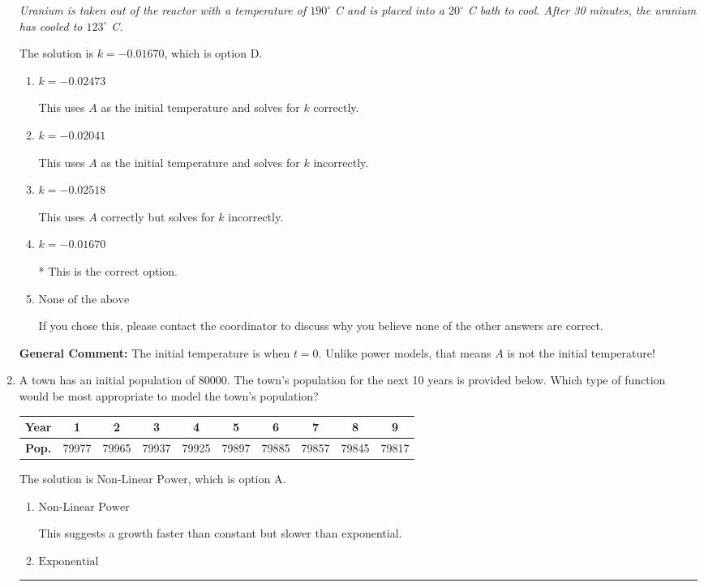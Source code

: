 \documentclass{extbook}[14pt]
\newcommand{\litem}[1]{\item #1

\rule{\textwidth}{0.4pt}}
\begin{document}
\begin{enumerate}
{\begin{center}
    \textit{ Uranium is taken out of the reactor with a temperature of $190^{\circ}$ C and is placed into a $20^{\circ}$ C bath to cool. After 30 minutes, the uranium has cooled to $123^{\circ}$ C. }
\end{center}


The solution is \( k = -0.01670 \), which is option D.\begin{enumerate}[label=\Alph*.]
\item \( k = -0.02473 \)

This uses $A$ as the initial temperature and solves for $k$ correctly.
\item \( k = -0.02041 \)

This uses $A$ as the initial temperature and solves for $k$ incorrectly.
\item \( k = -0.02518 \)

This uses $A$ correctly but solves for $k$ incorrectly.
\item \( k = -0.01670 \)

* This is the correct option.
\item \( \text{None of the above} \)

If you chose this, please contact the coordinator to discuss why you believe none of the other answers are correct.
\end{enumerate}

\textbf{General Comment:} The initial temperature is when $t = 0$. Unlike power models, that means $A$ is not the initial temperature!
}
\litem{
A town has an initial population of 80000. The town's population for the next 10 years is provided below. Which type of function would be most appropriate to model the town's population?



\begin{tabular}{c|c|c|c|c|c|c|c|c|c}
\textbf{Year} & 1 & 2 & 3 & 4 & 5 & 6 & 7 & 8 & 9 \tabularnewline
\hline
\textbf{Pop.} & 79977 & 79965 & 79937 & 79925 & 79897 & 79885 & 79857 & 79845 & 79817
\end{tabular} 

The solution is \( \text{Non-Linear Power} \), which is option A.\begin{enumerate}[label=\Alph*.]
\item \( \text{Non-Linear Power} \)

This suggests a growth faster than constant but slower than exponential.
\item \( \text{Exponential} \)


\end{enumerate}}
\end{enumerate}
\end{document}
